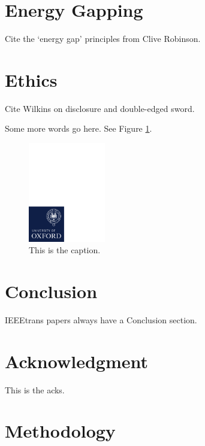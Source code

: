 \documentclass[conference]{IEEEtran}
\begin{document}
\section{Energy Gapping}

Cite the `energy gap' principles from Clive Robinson.

\section{Ethics}

Cite Wilkins on disclosure and double-edged sword.

\newpage

Some more words go here. See Figure \ref{figure:whatever}.

\begin{figure}[!t]
    \centering
	\includegraphics[width=0.3\textwidth,trim=0 0 117mm 183mm,clip]{graphics/ox_brand_cmyk_pos.pdf}
	\caption{This is the caption.}
	\label{figure:whatever}
\end{figure}


\section{Conclusion}

IEEEtrans papers always have a Conclusion section.

\section*{Acknowledgment}

This is the acks.

\section{Methodology}
\end{document}
